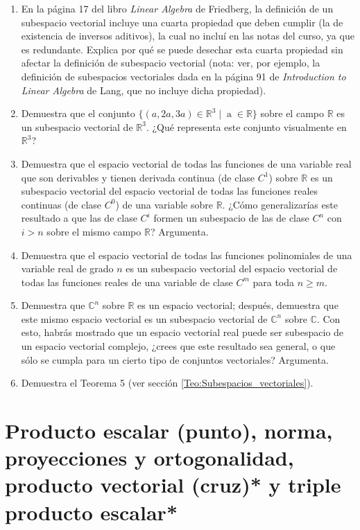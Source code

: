 \documentclass[12pt]{article}
\begin{document}
\begin{enumerate}
    \item En la página 17 del libro \textit{Linear Algebra} de Friedberg, la definición de un subespacio vectorial incluye una cuarta propiedad que deben cumplir (la de existencia de inversos aditivos), la cual no incluí en las notas del curso, ya que es redundante. Explica por qué se puede desechar esta cuarta propiedad sin afectar la definición de subespacio vectorial (nota: ver, por ejemplo, la definición de subespacios vectoriales dada en la página 91 de \textit{Introduction to Linear Algebra} de Lang, que no incluye dicha propiedad).
    \item Demuestra que el conjunto $\{(a,2a,3a)\in\mathbb{R}^3\mathop|\mathop a\in\mathbb{R}\}$ sobre el campo $\mathbb{R}$ es un subespacio vectorial de $\mathbb{R}^3$. ¿Qué representa este conjunto visualmente en $\mathbb{R}^3$?
    \item Demuestra que el espacio vectorial de todas las funciones de una variable real que son derivables y tienen derivada continua (de clase $C^1$) sobre $\mathbb{R}$ es un subespacio vectorial del espacio vectorial de todas las funciones reales continuas (de clase $C^0$) de una variable sobre $\mathbb{R}$. ¿Cómo generalizarías este resultado a que las de clase $C^i$ formen un subespacio de las de clase $C^n$ con $i>n$ sobre el mismo campo $\mathbb{R}$? Argumenta.
    \item Demuestra que el espacio vectorial de todas las funciones polinomiales de una variable real de grado $n$ es un subespacio vectorial del espacio vectorial de todas las funciones reales de una variable de clase $C^m$ para toda $n \geq m$.
    \item Demuestra que $\mathbb{C}^n$ sobre $\mathbb{R}$ es un espacio vectorial; después, demuestra que este mismo espacio vectorial es un subespacio vectorial de $\mathbb{C}^n$ sobre $\mathbb{C}$. Con esto, habrás mostrado que un espacio vectorial real puede ser subespacio de un espacio vectorial complejo, ¿crees que este resultado sea general, o que sólo se cumpla para un cierto tipo de conjuntos vectoriales? Argumenta.
    \item Demuestra el Teorema 5 (ver sección \ref{Teo:Subespacios_vectoriales}).
\end{enumerate}{}







\newpage
\section{Producto escalar (punto), norma, proyecciones y ortogonalidad, producto vectorial (cruz)* y triple producto escalar*}
\end{document}
